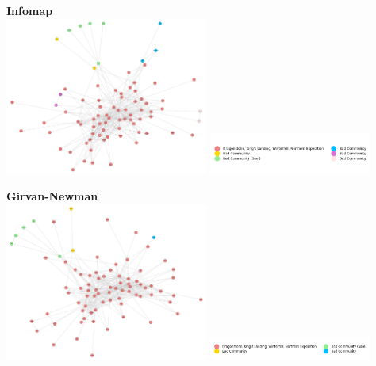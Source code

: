 \documentclass[10pt,twocolumn,letterpaper]{article}
\begin{document}
\begin{center}
    \textbf{Infomap}  \\

    \includegraphics[width=0.5\textwidth]{img/s7/communities_infomap.jpg}
    \includegraphics[width=0.4\textwidth]{img/s7/infomap_legend.jpg}\\
    \caption{\small{$\#communities=6$, $modularity=0.048$}}
\end{center}


\begin{center}
    \textbf{Girvan-Newman} \\
    \includegraphics[width=0.5\textwidth]{img/s7/communities_g-n.jpg}
    \includegraphics[width=0.4\textwidth]{img/s7/g-n_legend.jpg}\\
    \caption{\small{$\#communities=4$, $modularity=0.03$}}
\end{center}
\end{document}
